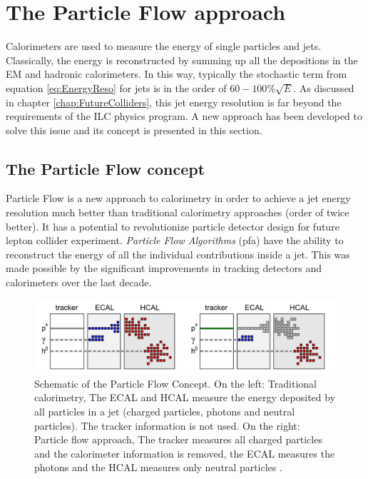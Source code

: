 \section{The Particle Flow approach}
\label{sec:PFA}

Calorimeters are used to measure the energy of single particles and jets. Classically, the energy is reconstructed by summing up all the depositions in the EM and hadronic calorimeters. In this way, typically the stochastic term from equation \ref{eq:EnergyReso} for jets is in the order of $60-100\%\sqrt{E}$. As discussed in chapter \ref{chap:FutureColliders}, this jet energy resolution is far beyond the requirements of the ILC physics program. A new approach has been developed to solve this issue and its concept is presented in this section.

\subsection{The Particle Flow concept}

Particle Flow is a new approach to calorimetry in order to achieve a jet energy resolution much better than traditional calorimetry approaches (order of twice better). It has a potential to revolutionize particle detector design for future lepton collider experiment. \textit{Particle Flow Algorithms} (\acrshort{pfa}) have the ability to reconstruct the energy of all the individual contributions inside a jet. This was made possible by the significant improvements in tracking detectors and calorimeters over the last decade.

\begin{figure}[htbp!]
  \centering
  \includegraphics[width=1\linewidth]{chap2/fig/PFAConcept.png}
  \caption{Schematic of the Particle Flow Concept. On the left: Traditional calorimetry, The ECAL and HCAL measure the energy deposited by all particles in a jet (charged particles, photons and neutral particles). The tracker information is not used. On the right: Particle flow approach, The tracker measures all charged particles and the calorimeter information is removed, the ECAL measures the photons and the HCAL measures only neutral particles \cite{Feege:2011dsa}.} \label{fig:PFAConcept}
\end{figure}

